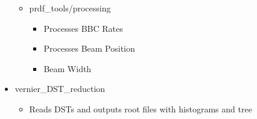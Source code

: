\begin{itemize}
\begin{itemize}
    \item prdf\_tools/processing
      \begin{itemize}
        \item Processes BBC Rates
	\item Processes Beam Position
	\item Beam Width
      \end{itemize}
  \end{itemize}
\item vernier\_DST\_reduction
  \begin{itemize}
    \item Reads DSTs and outputs root files with histograms and tree
   \end{itemize}
\end{itemize}
